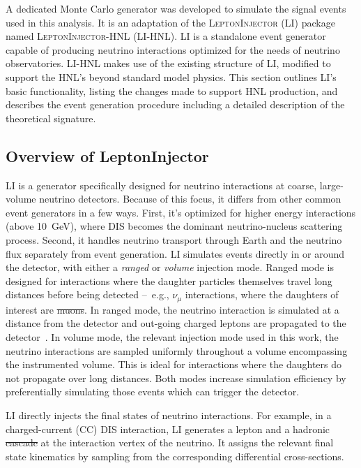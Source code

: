 \documentclass[
    aps,
    prd,
    reprint,
    amsmath,
    amssymb,
    nofootinbib,
    linenumbers,
    superscriptaddress,
    floatfix
]{revtex4-2}
\newcommand{\gev}{\giga\electronvolt}
\providecommand{\DIFaddtex}[1]{{\protect\color{blue}\uwave{#1}}} %
\providecommand{\DIFdeltex}[1]{{\protect\color{red}\sout{#1}}}                      %
\providecommand{\DIFaddbegin}{} %
\providecommand{\DIFaddend}{} %
\providecommand{\DIFdelbegin}{} %
\providecommand{\DIFdelend}{} %
\providecommand{\DIFadd}[1]{\texorpdfstring{\DIFaddtex{#1}}{#1}} %
\providecommand{\DIFdel}[1]{\texorpdfstring{\DIFdeltex{#1}}{}} %
\newcommand{\DIFscaledelfig}{0.5}
\newlength{\DIFdelgraphicswidth} %
\newlength{\DIFdelgraphicsheight} %
\newcommand{\DIFaddincludegraphics}[2][]{{\color{blue}\fbox{\DIFOincludegraphics[#1]{#2}}}} %
\newcommand{\DIFdelincludegraphics}[2][]{%
\sbox{\DIFdelgraphicsbox}{\DIFOincludegraphics[#1]{#2}}%
\settoboxwidth{\DIFdelgraphicswidth}{\DIFdelgraphicsbox} %
\settoboxtotalheight{\DIFdelgraphicsheight}{\DIFdelgraphicsbox} %
\scalebox{\DIFscaledelfig}{%
\parbox[b]{\DIFdelgraphicswidth}{\usebox{\DIFdelgraphicsbox}\\[-\baselineskip] \rule{\DIFdelgraphicswidth}{0em}}\llap{\resizebox{\DIFdelgraphicswidth}{\DIFdelgraphicsheight}{%
\setlength{\unitlength}{\DIFdelgraphicswidth}%
\begin{picture}(1,1)%
\thicklines\linethickness{2pt} %
{\color[rgb]{1,0,0}\put(0,0){\framebox(1,1){}}}%
{\color[rgb]{1,0,0}\put(0,0){\line( 1,1){1}}}%
{\color[rgb]{1,0,0}\put(0,1){\line(1,-1){1}}}%
\end{picture}%
}\hspace*{3pt}}} %
} %
\DeclareRobustCommand{\DIFaddbegin}{\DIFOaddbegin \let\includegraphics\DIFaddincludegraphics} %
\DeclareRobustCommand{\DIFaddend}{\DIFOaddend \let\includegraphics\DIFOincludegraphics} %
\DeclareRobustCommand{\DIFdelbegin}{\DIFOdelbegin \let\includegraphics\DIFdelincludegraphics} %
\DeclareRobustCommand{\DIFdelend}{\DIFOaddend \let\includegraphics\DIFOincludegraphics} %
\begin{document}
A dedicated Monte Carlo generator was developed to simulate the signal events used in this analysis. It is an adaptation of the \textsc{LeptonInjector} (LI) package~\cite{IceCube:2020tcq} named \textsc{LeptonInjector-HNL} (LI-HNL). LI is a standalone event generator capable of producing neutrino interactions optimized for the needs of neutrino observatories. LI-HNL makes use of the existing structure of LI, modified to support the HNL's beyond standard model physics.
This section outlines LI's basic functionality, listing the changes made to support HNL production, and describes the event generation procedure including a detailed description of the theoretical signature.


\subsection{Overview of LeptonInjector}

LI is a generator specifically designed for neutrino interactions at coarse, large-volume neutrino detectors.
Because of this focus, it differs from other common event generators in a few ways.
First, it's optimized for higher energy interactions (above \SI{10}{\gev}), where DIS becomes the dominant neutrino-nucleus scattering process.
Second, it handles neutrino transport through Earth and the neutrino flux separately from event generation.
LI simulates events directly in or around the detector, with either a \textit{ranged} or \textit{volume} injection mode.
Ranged mode is designed for interactions where the daughter particles themselves travel long distances before being detected --~e.g., $\nu_\mu$ interactions, where the daughters of interest are \DIFdelbegin \DIFdel{muons}\DIFdelend \DIFaddbegin \DIFadd{$\mu$'s}\DIFaddend .
In ranged mode, the neutrino interaction is simulated at a distance from the detector and out-going charged leptons are propagated to the detector~\cite{IceCube:2020tcq}.
In volume mode, the relevant injection mode used in this work, the neutrino interactions are sampled uniformly throughout a volume encompassing the instrumented volume.
This is ideal for interactions where the daughters do not propagate over long distances.
Both modes increase simulation efficiency by preferentially simulating those events which can trigger the detector.

LI directly injects the final states of neutrino interactions. For example, in a charged-current (CC) DIS interaction, LI generates a lepton and a hadronic \DIFdelbegin \DIFdel{cascade }\DIFdelend \DIFaddbegin \DIFadd{shower }\DIFaddend at the interaction vertex of the neutrino. It assigns the relevant final state kinematics by sampling from the corresponding differential cross-sections.
\end{document}
